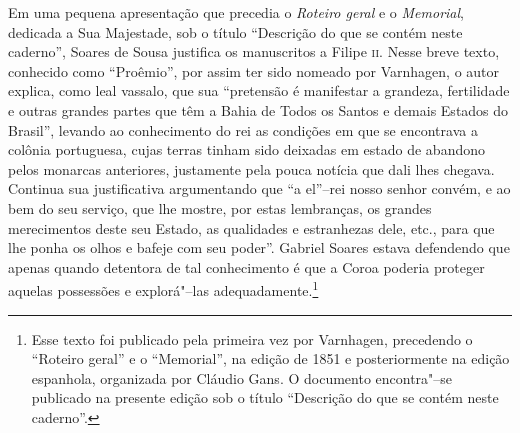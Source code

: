 \documentclass[12pt]{extarticle}
\begin{document}
{Em uma pequena apresentação que precedia o \textit{Roteiro geral} e o
\textit{Memorial}, dedicada a Sua Majestade, sob o título ``Descrição do
que se contém neste caderno'', Soares de Sousa justifica os manuscritos a
Filipe 	\textsc{ii}. Nesse breve texto, conhecido como ``Proêmio'', por assim ter
sido nomeado por Varnhagen, o autor explica, como leal vassalo, que sua
``pretensão é manifestar a grandeza, fertilidade e outras grandes partes
que têm a Bahia de Todos os Santos e demais Estados do Brasil'', levando
ao conhecimento do rei as condições em que se encontrava a colônia
portuguesa, cujas terras tinham sido deixadas em estado de abandono
pelos monarcas anteriores, justamente pela pouca notícia que dali lhes
chegava. Continua sua justificativa argumentando que ``a el''--rei nosso
senhor convém, e ao bem do seu serviço, que lhe mostre, por estas
lembranças, os grandes merecimentos deste seu Estado, as qualidades e
estranhezas dele, etc., para que lhe ponha os olhos e bafeje com seu
poder''. Gabriel Soares estava defendendo que apenas quando detentora de
tal conhecimento é que a Coroa poderia proteger aquelas possessões e
explorá"--las adequadamente.\footnote{Esse texto foi publicado pela
primeira vez por Varnhagen, precedendo o “Roteiro geral” e o
“Memorial”, na edição de 1851 e posteriormente na edição espanhola,
organizada por Cláudio Gans. O documento encontra"--se publicado na presente edição
sob o título “Descrição do que se contém neste caderno”.}

}
\end{document}
